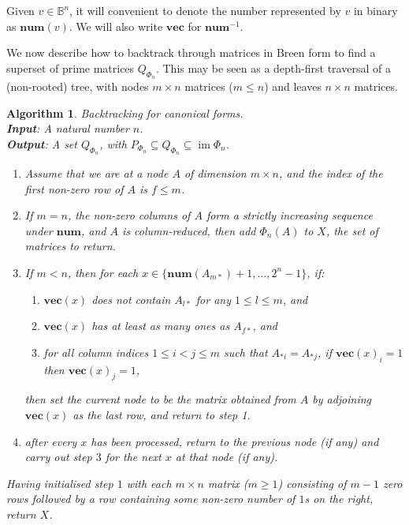 \documentclass[11pt]{article}
\newtheorem{algo}[thm]{Algorithm}
\newenvironment{alg}{\begin{algo}\rm}{\end{algo}}
\numberwithin{equation}{section}
\DeclareMathOperator{\im}{im}
\newcommand{\num}{\mathbf{num}}
\newcommand{\vect}{\mathbf{vec}}
\newcommand{\B}{\mathbb{B}}
\begin{document}
Given $v \in \B^n$, it will convenient to denote the number represented by $v$
in binary as $\num(v)$. We will also write $\vect$ for $\mathbf{num}^{-1}$.

We now describe how to backtrack through matrices in Breen form to find a
superset of prime matrices $Q_{\Phi_n}$. This may be seen as a depth-first
traversal of a (non-rooted) tree, with nodes $m\times n$ matrices ($m \leq
n$) and leaves $n \times n$ matrices.

\begin{alg}
  Backtracking for canonical forms.\\
  \textbf{Input}: A natural number $n$. \\
  \textbf{Output}: A set $Q_{\Phi_n}$, with $P_{\Phi_n} \subseteq Q_{\Phi_n}
  \subseteq \im\Phi_n$.
  \begin{enumerate}
    \item Assume that we are at a node $A$ of dimension $m \times n$, and the
      index of the first non-zero row of $A$ is $f \leq m$. 
    \item If $m = n$, the non-zero columns of $A$ form a strictly increasing
      sequence under $\num$, and $A$ is column-reduced, then add $\Phi_n(A)$ to
      $X$, the set of matrices to return.
    \item If $m < n$, then for each $x \in \{\num(A_{m*}) + 1,
        \ldots, 2^n - 1\}$, if:
      \begin{enumerate}[label={(\roman*)}]
        \item $\vect(x)$ does not contain $A_{l*}$ for any $1 \leq l \leq m$,
          and
        \item $\vect(x)$ has at least as many ones as $A_{f*}$,
          and
        \item for all column indices $1 \leq i < j \leq m$ such that $A_{*i} =
          A_{*j}$, if $\vect(x)_i = 1$ then $\vect(x)_j = 1$,
      \end{enumerate}
      then set the current node to be the matrix obtained from $A$ by adjoining
      $\vect(x)$ as the last row, and return to step 1.
    \item after every $x$ has been processed, return to the previous node (if
      any) and carry out step $3$ for the next $x$ at that node (if any).
  \end{enumerate}
  Having initialised step $1$ with each $m \times n$ matrix ($m \geq 1$)
  consisting of $m - 1$ zero rows followed by a row containing some non-zero
  number of $1$s on the right, return $X$.
\end{alg}
\end{document}
